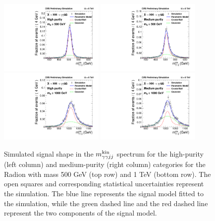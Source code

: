 \begin{figure}[htbp!]
 \begin{center}
   \includegraphics[width=0.45\textwidth]{figures/results/sigmodel_cat0_500GeV.pdf}
   \includegraphics[width=0.45\textwidth]{figures/results/sigmodel_cat1_500GeV.pdf}
   \includegraphics[width=0.45\textwidth]{figures/results/sigmodel_cat0_1000GeV.pdf}
   \includegraphics[width=0.45\textwidth]{figures/results/sigmodel_cat1_1000GeV.pdf}
 \end{center}
\caption{Simulated signal shape in the $m_{\gamma\gamma jj}^{\rm kin}$ spectrum for the high-purity (left column)
and medium-purity (right column) categories for the Radion with mass 500 GeV (top row) and
1 TeV (bottom row). The open squares and corresponding
statistical uncertainties represent the simulation.
The blue line represents the signal model fitted to the simulation, while the green dashed line
and the red dashed line represent the two components of the signal model.}
\label{fig:sigfit_500_1000}
\end{figure}


